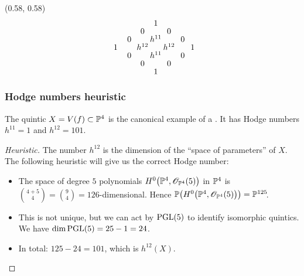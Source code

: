 \begin{frame}
{
    \begin{textblock}{0.4}(0.58, 0.58)
        \[
            \arraycolsep = 1pt%
            \def\arraystretch{0.5}%
            \begin{array}[c]{ccccccc}
                \phantom{h^03}  & \phantom{h^{02}} & \phantom{20} & 1 \\
                &&  0 && 0      & \phantom{h^30}                      \\
                &   0 && h^{11} && 0                                  \\
                    1 && h^{12} && h^{12} && 1                        \\
                &   0 && h^{11} && 0                                  \\
                &&  0 && 0 \vphantom{h^{32}}                          \\
                &&& 1 &&   \vphantom{h^{33}}
            \end{array}
        \]
    \end{textblock}
}
\end{frame}

\begin{frame}
\frametitle{Hodge numbers heuristic}

The quintic $X = V(f) \subset \P^4$ is the canonical example of a \CY. It has Hodge numbers $h^{11}=1$ and $h^{12}=101$.

\pause

\begin{proof}[Heuristic]
    The number $h^{12}$ is the dimension of the ``space of parameters'' of $X$. The following heuristic will give us the correct Hodge number: \pause
    \begin{itemize}
      \item
      The space of degree $5$ polynomials $H^0\big(\P^4, \OO_{\P^4}(5)\big)$ in $\P^4$ is $\binom{4 + 5}{4} = \binom{9}{4} = 126$-dimensional. Hence $\P\big(H^0\big(\P^4, \OO_{\P^4}(5)\big)\big) = \P^{125}\mkern-4mu$.
      \pause

      \item
      This is not unique, but we can act by $\PGL(5)$ to identify isomorphic quintics. We have $\dim \PGL(5)=25-1=24$.
      \pause

      \item
      In total: $125 - 24 = 101$, which is $h^{12}(X)$.
      \pause
    \end{itemize}
\end{proof}

\end{frame}